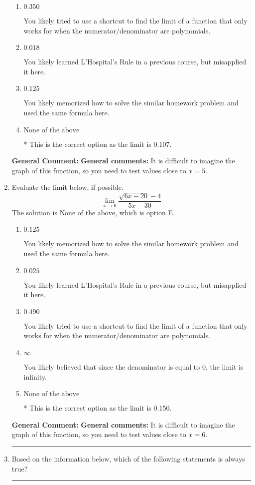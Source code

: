 \documentclass{extbook}[14pt]
\newcommand{\litem}[1]{\item #1

\rule{\textwidth}{0.4pt}}
\begin{document}
\begin{enumerate}
{\begin{enumerate}[label=\Alph*.]
You likely believed that since the denominator is equal to 0, the limit is infinity.
\item \( 0.350 \)

You likely tried to use a shortcut to find the limit of a function that only works for when the numerator/denominator are polynomials.
\item \( 0.018 \)

You likely learned L'Hospital's Rule in a previous course, but misapplied it here.
\item \( 0.125 \)

You likely memorized how to solve the similar homework problem and used the same formula here.
\item \( \text{None of the above} \)

* This is the correct option as the limit is 0.107.
\end{enumerate}

\textbf{General Comment:} \textbf{General comments:} It is difficult to imagine the graph of this function, so you need to test values close to $x = 5$.
}
\litem{
Evaluate the limit below, if possible.
\[ \lim_{x \rightarrow 6} \frac{\sqrt{6x - 20} - 4}{5x - 30} \]The solution is \( \text{None of the above} \), which is option E.\begin{enumerate}[label=\Alph*.]
\item \( 0.125 \)

You likely memorized how to solve the similar homework problem and used the same formula here.
\item \( 0.025 \)

You likely learned L'Hospital's Rule in a previous course, but misapplied it here.
\item \( 0.490 \)

You likely tried to use a shortcut to find the limit of a function that only works for when the numerator/denominator are polynomials.
\item \( \infty \)

You likely believed that since the denominator is equal to 0, the limit is infinity.
\item \( \text{None of the above} \)

* This is the correct option as the limit is 0.150.
\end{enumerate}

\textbf{General Comment:} \textbf{General comments:} It is difficult to imagine the graph of this function, so you need to test values close to $x = 6$.
}
\litem{
Based on the information below, which of the following statements is always true?

}
\end{enumerate}
\end{document}
